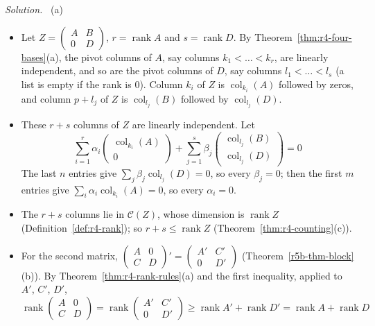 \documentclass[12pt]{article}
\DeclareMathOperator{\col}{col}
\DeclareMathOperator{\rank}{rank}
\theoremstyle{definition}
\newenvironment{solution}{\par\noindent\textit{Solution.}\ }{\par\smallskip}
\begin{document}
\begin{solution}
(a)
\begin{itemize}
\item Let \(Z=\left(\begin{smallmatrix}A&B\\0&D\end{smallmatrix}\right)\), \(r=\rank A\) and \(s=\rank D\). By
Theorem~\ref{thm:r4-four-bases}(a), the pivot columns of \(A\), say columns \(k_1<\dots<k_r\), are linearly
independent, and so are the pivot columns of \(D\), say columns \(l_1<\dots<l_s\) (a list is empty if the rank is
\(0\)). Column \(k_i\) of \(Z\) is \(\col_{k_i}(A)\) followed by zeros, and column \(p+l_j\) of \(Z\) is \(\col_{l_j}(B)\)
followed by \(\col_{l_j}(D)\).
\item These \(r+s\) columns of \(Z\) are linearly independent. Let
\[
\sum_{i=1}^r\alpha_i\begin{pmatrix}\col_{k_i}(A)\\0\end{pmatrix}+\sum_{j=1}^s\beta_j\begin{pmatrix}\col_{l_j}(B)\\\col_{l_j}(D)\end{pmatrix}=0
\]
The last \(n\) entries give \(\sum_j\beta_j\col_{l_j}(D)=0\), so every \(\beta_j=0\); then the first \(m\) entries give
\(\sum_i\alpha_i\col_{k_i}(A)=0\), so every \(\alpha_i=0\).
\item The \(r+s\) columns lie in \(\mathcal C(Z)\), whose dimension is \(\rank Z\) (Definition~\ref{def:r4-rank}); so
\(r+s\leqslant\rank Z\) (Theorem~\ref{thm:r4-counting}(c)).
\item For the second matrix, \(\left(\begin{smallmatrix}A&0\\C&D\end{smallmatrix}\right)'
=\left(\begin{smallmatrix}A'&C'\\0&D'\end{smallmatrix}\right)\) (Theorem~\ref{r5b-thm-block}(b)). By
Theorem~\ref{thm:r4-rank-rules}(a) and the first inequality, applied to \(A'\), \(C'\), \(D'\),
\[
\rank\begin{pmatrix}A&0\\C&D\end{pmatrix}=\rank\begin{pmatrix}A'&C'\\0&D'\end{pmatrix}\geqslant\rank A'+\rank D'
=\rank A+\rank D
\]

\end{itemize}
\end{solution}
\end{document}
